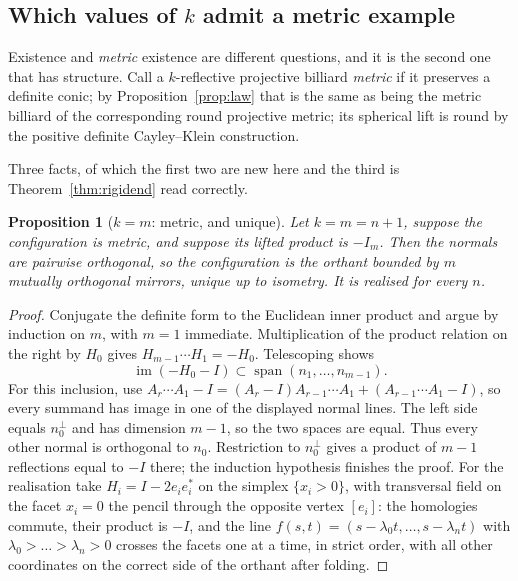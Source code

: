 \documentclass[11pt,a4paper]{article}
\theoremstyle{plain}
\newtheorem{proposition}[theorem]{Proposition}
\theoremstyle{definition}
\theoremstyle{remark}
\begin{document}
\subsection{Which values of $k$ admit a metric example}

Existence and \emph{metric} existence are different questions, and it is the second
one that has structure. Call a $k$-reflective projective billiard \emph{metric} if it
preserves a definite conic; by Proposition~\ref{prop:law} that is the same as being
the metric billiard of the corresponding round projective metric; its
spherical lift is round by the positive definite Cayley--Klein construction.

Three facts, of which the first two are new here and the third is
Theorem~\ref{thm:rigidend} read correctly.

\begin{proposition}[$k=m$: metric, and unique]\label{prop:kmunique}
Let $k=m=n+1$, suppose the configuration is metric, and suppose its lifted
product is $-I_m$. Then the normals are
pairwise orthogonal, so the configuration is the orthant bounded by $m$ mutually
orthogonal mirrors, unique up to isometry. It is realised for every $n$.
\end{proposition}

\begin{proof}
Conjugate the definite form to the Euclidean inner product and argue by
induction on $m$, with $m=1$ immediate. Multiplication of the product relation
on the right by $H_0$ gives $H_{m-1}\cdots H_1=-H_0$. Telescoping shows
\[
 \operatorname{im}(-H_0-I)\subset
 \operatorname{span}(n_1,\ldots,n_{m-1}).
\]
For this inclusion, use
$A_r\cdots A_1-I=(A_r-I)A_{r-1}\cdots A_1+(A_{r-1}\cdots A_1-I)$,
so every summand has image in one of the displayed normal lines.
The left side equals $n_0^\perp$ and has dimension $m-1$, so the two spaces
are equal. Thus every other normal is orthogonal to $n_0$. Restriction to
$n_0^\perp$ gives a product of $m-1$ reflections equal to $-I$ there;
the induction hypothesis finishes the proof. For the
realisation take $H_i=I-2e_ie_i^{\ast}$ on the simplex $\{x_i>0\}$, with transversal
field on the facet $x_i=0$ the pencil through the opposite vertex $[e_i]$: the
homologies commute, their product is $-I$, and the line
$f(s,t)=(s-\lambda_0t,\dots,s-\lambda_nt)$ with $\lambda_0>\dots>\lambda_n>0$ crosses
the facets one at a time, in strict order, with all other coordinates on the correct
side of the orthant after folding.
\end{proof}
\end{document}
